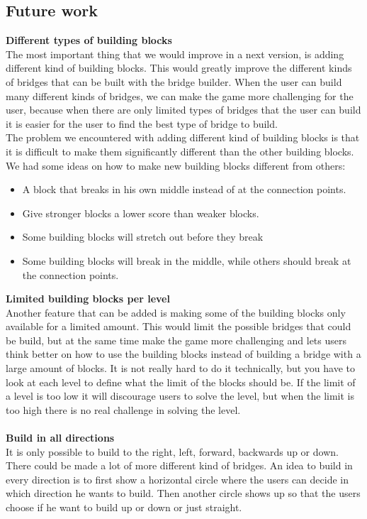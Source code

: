 \subsection{Future work}
\textbf{Different types of building blocks}\\
The most important thing that we would improve in a next version, is adding different kind of building blocks. This would greatly improve the different kinds of bridges that can be built with the bridge builder. When the user can build many different kinds of bridges, we can make the game more challenging for the user, because when there are only limited types of bridges that the user can build it is easier for the user to find the best type of bridge to build. \\
The problem we encountered with adding different kind of building blocks is that it is difficult to make them significantly different than the other building blocks. We had some ideas on how to make new building blocks different from others:\\
\begin{itemize}
\item A block that breaks in his own middle instead of at the connection points.
\item Give stronger blocks a lower score than weaker blocks.
\item Some building blocks will stretch out before they break
\item Some building blocks will break in the middle, while others should break at the connection points.
\end{itemize} 
\textbf{Limited building blocks per level}\\
Another feature that can be added is making some of the building blocks only available for a limited amount. This would limit the possible bridges that could be build, but at the same time make the game more challenging and lets users think better on how to use the building blocks instead of building a bridge with a large amount of blocks.  
It is not really hard to do it technically, but you have to look at each level to define what the limit of the blocks should be. If the limit of a level is too low it will discourage users to solve the level, but when the limit is too high there is no real challenge in solving the level.\\ \\
\textbf{Build in all directions}\\
It is only possible to build to the right, left, forward, backwards up or down. There could be made a lot of more different kind of bridges. An idea to build in every direction is to first show a horizontal circle where the users can decide in which direction he wants to build. Then another circle shows up so that the users choose if he want to build up or down or just straight. 

